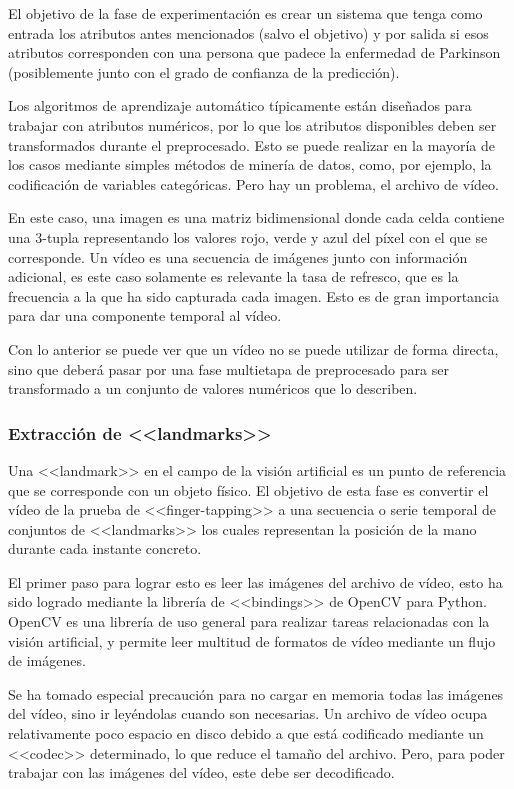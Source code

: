 El objetivo de la fase de experimentación es crear un sistema que tenga como
entrada los atributos antes mencionados (salvo el objetivo) y por salida si esos
atributos corresponden con una persona que padece la enfermedad de Parkinson
(posiblemente junto con el grado de confianza de la predicción).

Los algoritmos de aprendizaje automático típicamente están diseñados para
trabajar con atributos numéricos, por lo que los atributos disponibles deben ser
transformados durante el preprocesado. Esto se puede realizar en la mayoría de
los casos mediante simples métodos de minería de datos, como, por ejemplo, la
codificación de variables categóricas. Pero hay un problema, el archivo de
vídeo.

En este caso, una imagen es una matriz bidimensional donde cada celda contiene
una 3-tupla representando los valores rojo, verde y azul del píxel con el que se
corresponde. Un vídeo es una secuencia de imágenes junto con información
adicional, es este caso solamente es relevante la tasa de refresco, que es la
frecuencia a la que ha sido capturada cada imagen. Esto es de gran importancia
para dar una componente temporal al vídeo.

Con lo anterior se puede ver que un vídeo no se puede utilizar de forma directa,
sino que deberá pasar por una fase multietapa de preprocesado para ser
transformado a un conjunto de valores numéricos que lo describen.

\subsubsection{Extracción de <<landmarks>>}

Una <<landmark>> en el campo de la visión artificial es un punto de referencia
que se corresponde con un objeto físico. El objetivo de esta fase es convertir
el vídeo de la prueba de <<finger-tapping>> a una secuencia o serie temporal de
conjuntos de <<landmarks>> los cuales representan la posición de la mano durante
cada instante concreto.

El primer paso para lograr esto es leer las imágenes del archivo de vídeo, esto
ha sido logrado mediante la librería de <<bindings>> de OpenCV para Python.
OpenCV es una librería de uso general para realizar tareas relacionadas con la
visión artificial, y permite leer multitud de formatos de vídeo mediante un
flujo de imágenes.

Se ha tomado especial precaución para no cargar en memoria todas las imágenes
del vídeo, sino ir leyéndolas cuando son necesarias. Un archivo de vídeo ocupa
relativamente poco espacio en disco debido a que está codificado mediante un
<<codec>> determinado, lo que reduce el tamaño del archivo. Pero, para poder
trabajar con las imágenes del vídeo, este debe ser decodificado.

